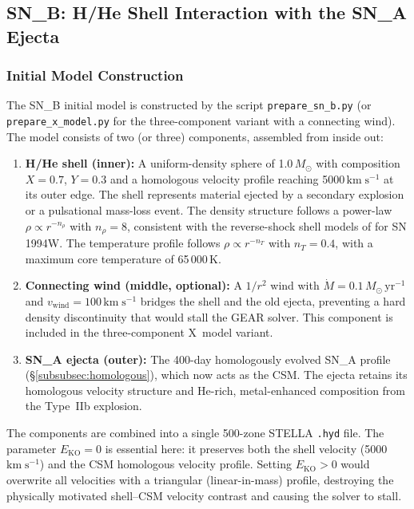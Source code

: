 \documentclass[11pt, a4paper]{article}
\newcommand{\Msun}{\ensuremath{M_\odot}}
\newcommand{\kms}{\ensuremath{\mathrm{km\;s^{-1}}}}
\newcommand{\EKO}{\ensuremath{E_{\mathrm{KO}}}}
\newcommand{\vwind}{\ensuremath{v_{\mathrm{wind}}}}
\newcommand{\mdot}{\ensuremath{\dot{M}}}
\begin{document}
\subsection{SN\_B: H/He Shell Interaction with the SN\_A Ejecta}
\label{subsec:sn_b}

\subsubsection{Initial Model Construction}
\label{subsubsec:sn_b_initial}

The SN\_B initial model is constructed by the script
\texttt{prepare\_sn\_b.py} (or \texttt{prepare\_x\_model.py} for the
three-component variant with a connecting wind).  The model consists of
two (or three) components, assembled from inside out:

\begin{enumerate}
    \item \textbf{H/He shell (inner):} A uniform-density sphere of
    1.0\,$\Msun$ with composition $X = 0.7$, $Y = 0.3$ and a homologous
    velocity profile reaching 5000\,$\kms$ at its outer edge.  The shell
    represents material ejected by a secondary explosion or a
    pulsational mass-loss event.  The density structure follows a
    power-law $\rho \propto r^{-n_\rho}$ with $n_\rho = 8$, consistent
    with the reverse-shock shell models of \citet{Dessart2016} for
    SN\,1994W.  The temperature profile follows $\rho \propto r^{-n_T}$
    with $n_T = 0.4$, with a maximum core temperature of 65\,000\,K.

    \item \textbf{Connecting wind (middle, optional):} A $1/r^2$ wind
    with $\mdot = 0.1\,\Msun\,\mathrm{yr^{-1}}$ and $\vwind = 100\,\kms$
    bridges the shell and the old ejecta, preventing a hard density
    discontinuity that would stall the GEAR solver.  This component is
    included in the three-component X~model variant.

    \item \textbf{SN\_A ejecta (outer):} The 400-day homologously evolved
    SN\_A profile (\S\ref{subsubsec:homologous}), which now acts as the
    CSM.  The ejecta retains its homologous velocity structure and
    He-rich, metal-enhanced composition from the Type~IIb explosion.
\end{enumerate}

The components are combined into a single 500-zone STELLA
\texttt{.hyd} file.  The parameter $\EKO = 0$ is essential here: it
preserves both the shell velocity (5000\,$\kms$) and the CSM homologous
velocity profile.  Setting $\EKO > 0$ would overwrite all velocities with
a triangular (linear-in-mass) profile, destroying the physically motivated
shell--CSM velocity contrast and causing the solver to stall.
\end{document}
